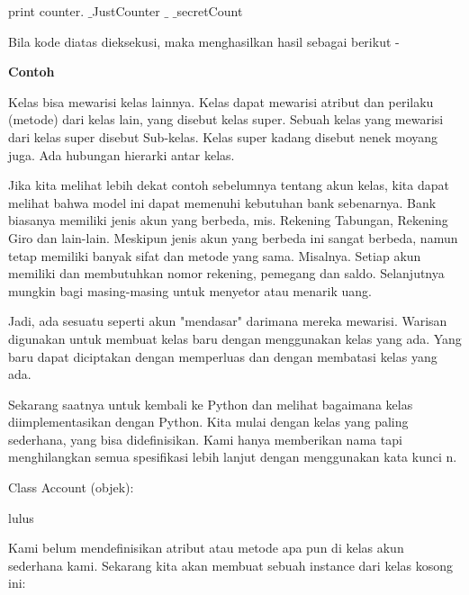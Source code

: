 \documentclass[a4paper,12pt]{report}
\begin{document}
\vspace{12pt}
\noindent 
print counter. $  \_  $JustCounter $  \_  $ $  \_  $secretCount \par
\noindent 
Bila kode diatas dieksekusi, maka menghasilkan hasil sebagai berikut - \par
\vspace{12pt}
 \par
{} \par
{} \par
\vspace{12pt}
\noindent 
\textbf{Contoh} \par
\vspace{12pt}
\noindent 
Kelas bisa mewarisi kelas lainnya. Kelas dapat mewarisi atribut dan perilaku (metode) dari kelas lain, yang disebut kelas super. Sebuah kelas yang mewarisi dari kelas super disebut Sub-kelas. Kelas super kadang disebut nenek moyang juga. Ada hubungan hierarki antar kelas. \par
\noindent 
Jika kita melihat lebih dekat contoh sebelumnya tentang akun kelas, kita dapat melihat bahwa model ini dapat memenuhi kebutuhan bank sebenarnya. Bank biasanya memiliki jenis akun yang berbeda, mis. Rekening Tabungan, Rekening Giro dan lain-lain. Meskipun jenis akun yang berbeda ini sangat berbeda, namun tetap memiliki banyak sifat dan metode yang sama. Misalnya. Setiap akun memiliki dan membutuhkan nomor rekening, pemegang dan saldo. Selanjutnya mungkin bagi masing-masing untuk menyetor atau menarik uang. \par
\noindent 
Jadi, ada sesuatu seperti akun "mendasar" darimana mereka mewarisi. Warisan digunakan untuk membuat kelas baru dengan menggunakan kelas yang ada. Yang baru dapat diciptakan dengan memperluas dan dengan membatasi kelas yang ada. \par
\noindent 
\vspace{12pt}
\noindent 
Sekarang saatnya untuk kembali ke Python dan melihat bagaimana kelas diimplementasikan dengan Python. Kita mulai dengan kelas yang paling sederhana, yang bisa didefinisikan. Kami hanya memberikan nama tapi menghilangkan semua spesifikasi lebih lanjut dengan menggunakan kata kunci n. \par
\noindent 
\vspace{12pt}
\noindent 
Class Account (objek): \par
\noindent 
lulus \par
\noindent 
\vspace{12pt}
\noindent 
Kami belum mendefinisikan atribut atau metode apa pun di kelas akun sederhana kami. Sekarang kita akan membuat sebuah instance dari kelas kosong ini: \par
\end{document}
